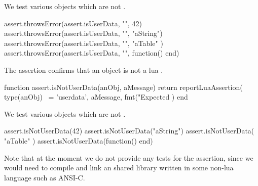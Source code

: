 
We test various objects which are not .

\startLuaTest
  assert.throwsError(assert.isUserData, "", 42)
  assert.throwsError(assert.isUserData, "", "aString")
  assert.throwsError(assert.isUserData, "", { "aTable" })
  assert.throwsError(assert.isUserData, "", function() end)
\stopLuaTest
\stopTestCase

\stopTestSuite

\godown[2ex]
The  assertion confirms that an object is not a 
lua . 


\startLuaCode
function assert.isNotUserData(anObj, aMessage)
  return reportLuaAssertion(
    type(anObj) ~= 'userdata',
    aMessage,
    fmt("Expected %
  )
end
\stopLuaCode


We test various objects which are not .

\startLuaTest
  assert.isNotUserData(42)
  assert.isNotUserData("aString")
  assert.isNotUserData({ "aTable" })
  assert.isNotUserData(function() end)
\stopLuaTest
\stopTestCase

\godown[2ex]
Note that at the moment we do not provide any  tests for 
the  assertion, since we would need to compile 
and link an shared library written in some non-lua language such as 
ANSI-C. 

\stopTestSuite


\stopchapter
